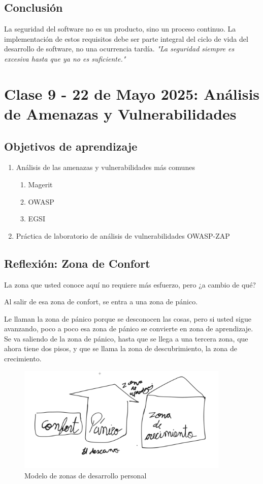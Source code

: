 \documentclass[12pt,a4paper]{article}
\begin{document}
\subsection{Conclusión}
La seguridad del software no es un producto, sino un proceso continuo. La implementación de estos requisitos debe ser parte integral del ciclo de vida del desarrollo de software, no una ocurrencia tardía.
\textit{"La seguridad siempre es excesiva hasta que ya no es suficiente."}


\section{Clase 9 - 22 de Mayo 2025: Análisis de Amenazas y Vulnerabilidades}

\subsection{Objetivos de aprendizaje}
\begin{enumerate}
    \item Análisis de las amenazas y vulnerabilidades más comunes
    \begin{enumerate}
        \item Magerit
        \item OWASP
        \item EGSI
    \end{enumerate}
    \item Práctica de laboratorio de análisis de vulnerabilidades OWASP-ZAP
\end{enumerate}


\subsection{Reflexión: Zona de Confort}

La zona que usted conoce aquí no requiere más esfuerzo, pero ¿a cambio de qué?

Al salir de esa zona de confort, se entra a una zona de pánico. 

Le llaman la zona de pánico porque se desconocen las cosas, pero si usted sigue avanzando, poco a poco esa zona de pánico se convierte en zona de aprendizaje. Se va saliendo de la zona de pánico, hasta que se llega a una tercera zona, que ahora tiene dos pisos, y que se llama la zona de descubrimiento, la zona de crecimiento. 

\begin{figure}[H]
\centering
\includegraphics[width=0.9\textwidth]{confort.png}
\caption{Modelo de zonas de desarrollo personal}
\label{fig:confort}
\end{figure}
\end{document}
